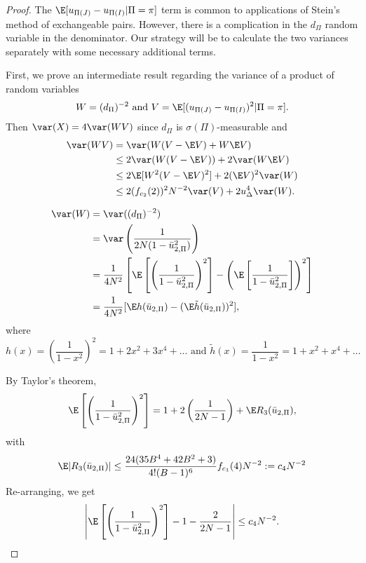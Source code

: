 \begin{proof}
  The $\E[u_{\Pi(J)}-u_{\Pi(I)} | \Pi = \pi]$ term is common to applications of Stein's method of
  exchangeable pairs.  However, there is a complication in the $d_{\Pi}$ random variable in the
  denominator.  Our strategy will be to calculate the two variances separately with some necessary
  additional terms.

  First, we prove an intermediate result regarding the variance of a product of random variables
  \begin{equation*}
    W = (d_{\Pi})^{-2} \text{ and } V = \E [(u_{\Pi(J)} - u_{\Pi(I)})^2 | \Pi = \pi].
  \end{equation*}
  Then $\var(X) = 4 \var(WV)$ since $d_{\Pi}$ is $\sigma(\Pi)$-measurable and
  \begin{align}
    \label{E:var_prod}
    \var(WV) &= \var(W(V-\E V) + W \E V) \nonumber \\
    &\leq 2\var(W(V-\E V)) + 2 \var (W \E V) \nonumber \\
    &\leq 2 \E [W^2 (V-\E V)^2] + 2(\E V)^2 \var(W) \nonumber \\
    &\leq 2(f_{c_2}(2))^2 N^{-2} \var(V) + 2u_{\Delta}^4 \var(W).
  \end{align}

  \begin{align*}
    \var(W) &= \var ((d_{\Pi})^{-2}) \\
    &= \var \left ( \frac{1}{2N(1-\bar{u}_{2,\Pi}^2)} \right ) \\
    &= \frac{1}{4N^2} \left [ \E \left [ \left (\frac{1}{1-\bar{u}_{2,\Pi}^2}
        \right )^2 \right ] -
      \left ( \E \left [ \frac{1}{1-\bar{u}_{2,\Pi}^2} \right ] \right )^2
    \right ] \\
    &= \frac{1}{4N^2}[\E h(\bar{u}_{2,\Pi}) - (\E \tilde{h}(\bar{u}_{2,\Pi}))^2],
  \end{align*}
  where
  \begin{equation*}
    h(x) = \left ( \frac{1}{1-x^2} \right )^2 = 1 + 2x^2 + 3x^4 + \dots
      \text{ and } \tilde{h}(x) = \frac{1}{1-x^2} = 1 + x^2 + x^4 + \ldots
  \end{equation*}

  By Taylor's theorem,
  \begin{equation*}
    \E \left [ \left (\frac{1}{1-\bar{u}_{2,\Pi}^2} \right )^2 \right ]
    = 1 + 2 \left ( \frac{1}{2N-1} \right ) + \E R_3(\bar{u}_{2,\Pi}),
  \end{equation*}
  with
  \begin{equation*}
    \E |R_3(\bar{u}_{2,\Pi})| \leq \frac{24(35B^4 + 42 B^2 + 3)}{4!(B-1)^6}f_{c_1}(4) N^{-2}
    := c_4 N^{-2}
  \end{equation*}
  Re-arranging, we get
  \begin{equation*}
    \left | \E \left [ \left (\frac{1}{1-\bar{u}_{2,\Pi}^2} \right )^2 \right ]
      - 1 - \frac{2}{2N-1} \right | \leq c_4 N^{-2}.
  \end{equation*}


\end{proof}
